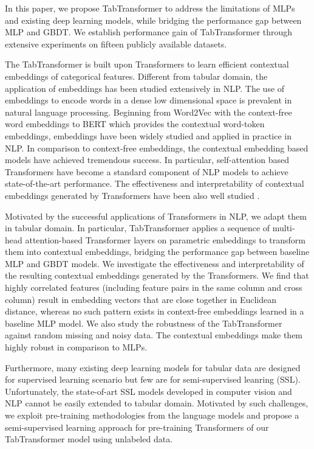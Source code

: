 In this paper, we propose TabTransformer to address the limitations of MLPs and existing deep learning models, while bridging the performance gap between MLP and GBDT. We establish performance gain of TabTransformer through extensive experiments on fifteen publicly available datasets. 

The TabTransformer is built upon Transformers \citep{vaswani2017attention} to learn efficient contextual embeddings of categorical features. 
Different from tabular domain, the application of embeddings has been studied extensively in NLP. 
The use of embeddings to encode words in a dense low dimensional space is prevalent in natural language processing. Beginning from Word2Vec \citep{rong2014word2vec} with the context-free word embeddings to BERT \citep{Devlin2019BERTPO} which provides the contextual word-token embeddings, embeddings have been widely studied and applied in practice in NLP. In comparison to context-free embeddings, the contextual embedding based models \cite{mikolov2011extensions, huang2015bidirectional, Devlin2019BERTPO} have achieved tremendous success. In particular, self-attention based Transformers \citep{vaswani2017attention} have become a standard component of NLP models to achieve state-of-the-art performance. The effectiveness and interpretability of contextual embeddings generated by Transformers have been also well studied \citep{coenen2019visualizing, brunner2019validity}.

Motivated by the successful applications of Transformers in NLP,
we adapt them %
in tabular domain. 
In particular, TabTransformer applies a sequence of multi-head attention-based Transformer layers on parametric embeddings to transform them into contextual embeddings, bridging the performance gap between baseline MLP and GBDT models. We investigate the effectiveness and interpretability of the resulting contextual embeddings generated by the Transformers. We find that highly correlated features (including feature pairs in the same column and cross column) result in embedding vectors that are close together in Euclidean distance,
whereas no such pattern exists in context-free embeddings learned in a baseline MLP model. We also study the robustness of the TabTransformer against random missing and noisy data. The contextual embeddings make them highly robust in comparison to MLPs. %

Furthermore, many existing deep learning models for tabular data are designed for supervised learning scenario but few are for semi-supervised leanring (SSL). Unfortunately, the state-of-art SSL models developed in computer vision \citep{voulodimos2018deep, kendall2017uncertainties} and NLP \citep{vaswani2017attention, Devlin2019BERTPO} cannot be easily extended to tabular domain. Motivated by such challenges, we exploit pre-training methodologies from the language models and propose a semi-supervised learning approach for pre-training Transformers of our TabTransformer model using unlabeled data. 

